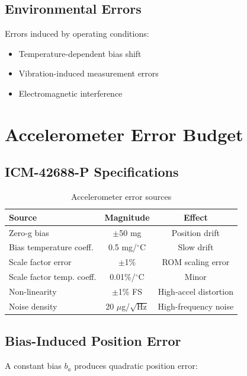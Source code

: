\subsection{Environmental Errors}

Errors induced by operating conditions:
\begin{itemize}
    \item Temperature-dependent bias shift
    \item Vibration-induced measurement errors
    \item Electromagnetic interference
\end{itemize}

\section{Accelerometer Error Budget}

\subsection{ICM-42688-P Specifications}

\begin{table}[h]
    \centering
    \caption{Accelerometer error sources}
    \label{tab:accel_error}
    \begin{tabular}{lcc}
        \toprule
        \textbf{Source} & \textbf{Magnitude} & \textbf{Effect} \\
        \midrule
        Zero-g bias & $\pm$50 mg & Position drift \\
        Bias temperature coeff. & 0.5 mg/$^\circ$C & Slow drift \\
        Scale factor error & $\pm$1\% & ROM scaling error \\
        Scale factor temp. coeff. & 0.01\%/$^\circ$C & Minor \\
        Non-linearity & $\pm$1\% FS & High-accel distortion \\
        Noise density & 20 $\mu$g/$\sqrt{\text{Hz}}$ & High-frequency noise \\
        \bottomrule
    \end{tabular}
\end{table}

\subsection{Bias-Induced Position Error}

A constant bias $b_a$ produces quadratic position error:

